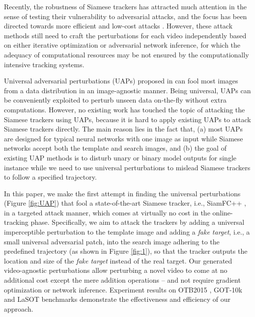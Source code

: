 \documentclass[journal]{IEEEtran}
\newcommand{\ie}{i.e.}
\begin{document}
Recently, the robustness of Siamese trackers has attracted much attention in the sense of testing their vulnerability to adversarial attacks, and the focus has been directed towards more efficient and low-cost attacks \cite{TTP,FAN,SPARK,chen2020one}. However, these attack methods still need to craft the perturbations for each video independently based on either iterative optimization or adversarial network inference, for which the adequacy of computational resources may be not ensured by the computationally intensive tracking systems. 

Universal adversarial perturbations (UAPs) proposed in \cite{UAP} can fool most images from a data distribution in an image-agnostic manner. Being universal, UAPs can be conveniently exploited to perturb unseen data on-the-fly without extra computations. However, no existing work has touched the topic of attacking the Siamese trackers using UAPs, because it is hard to apply existing UAPs to attack Siamese trackers directly. The main reason lies in the fact that, (a) most UAPs are designed for typical neural networks with one image as input while Siamese networks accept both the template and search images, and (b) the goal of existing UAP methods is to disturb unary or binary model outputs for single instance while we need to use universal perturbations to mislead Siamese trackers to follow a specified trajectory.
  
In this paper, we make the first attempt in finding the universal perturbations (Figure \ref{fig:UAP}) that fool a state-of-the-art Siamese tracker, \ie, SiamFC++ \cite{SiamFC++}, in a targeted attack manner, which comes at virtually no cost in the online-tracking phase. Specifically, we aim to attack the trackers by adding a universal imperceptible perturbation to the template image and adding a \textit{fake target}, \ie, a small universal adversarial patch, into the search image adhering to the predefined trajectory (as shown in Figure \ref{fig:1}), so that the tracker outputs the location and size of the \textit{fake target} instead of the real target. Our generated video-agnostic perturbations allow perturbing a novel video to come at no additional cost except the mere addition operations -- and not require gradient optimization or network inference. Experiment results on OTB2015 \cite{OTB}, GOT-10k \cite{GOT-10k} and LaSOT \cite{GOT-10k} benchmarks demonstrate the effectiveness and efficiency of our approach.
\end{document}
